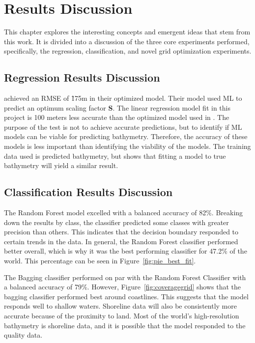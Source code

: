 \section{Results Discussion}
\label{sec:discussion}
\setlength{\parindent}{10ex}
This chapter explores the interesting concepts and emergent ideas that stem from this work.
It is divided into a discussion of the three core experiments performed, specifically, the regression, classification, and novel grid optimization experiments.

\subsection{Regression Results Discussion}
\cite{jena2012prediction} achieved an \ac{RMSE} of \~175m in their optimized model.
Their model used \ac{ML} to predict an optimum scaling factor \textbf{S}.
The linear regression model fit in this project is 100 meters less accurate than the optimized model used in \cite{jena2012prediction}.
The purpose of the test is not to achieve accurate predictions, but to identify if \ac{ML} models can be viable for predicting bathymetry.
Therefore, the accuracy of these models is less important than identifying the viability of the models.
The training data used is predicted bathymetry, but shows that fitting a model to true bathymetry will yield a similar result.

\subsection{Classification Results Discussion}
The Random Forest model excelled with a balanced accuracy of 82\%.
Breaking down the results by class, the classifier predicted some classes with greater precision than others.
This indicates that the decision boundary responded to certain trends in the data.
In general, the Random Forest classifier performed better overall, which is why it was the best performing classifier for 47.2\% of the world.
This percentage can be seen in Figure~\ref{fig:pie_best_fit}.

\par
The Bagging classifier performed on par with the Random Forest Classifier with a balanced accuracy of 79\%.
However, Figure~\ref{fig:coveragegrid} shows that the bagging classifier performed best around coastlines.
This suggests that the model responds well to shallow waters.
Shoreline data will also be consistently more accurate because of the proximity to land.
Most of the world's high-resolution bathymetry is shoreline data, and it is possible that the model responded to the quality data.



